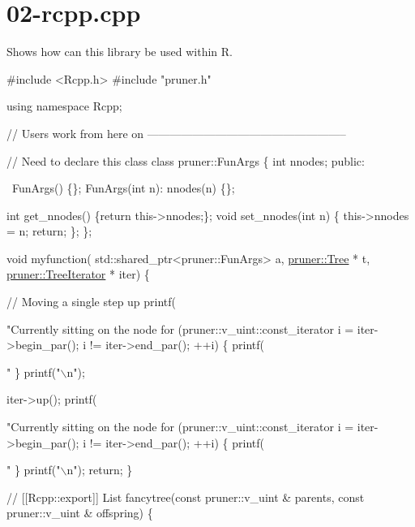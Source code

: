 \hypertarget{02-rcpp_8cpp-example}{}\section{02-\/rcpp.\+cpp}
Shows how can this library be used within R.


\begin{DoxyCodeInclude}
\textcolor{preprocessor}{#include <Rcpp.h>}
\textcolor{preprocessor}{#include "pruner.h"}  

\textcolor{keyword}{using namespace }Rcpp; 

\textcolor{comment}{// Users work from here on -----------------------------------------------------}

\textcolor{comment}{// Need to declare this class}
\textcolor{keyword}{class }pruner::FunArgs \{
  \textcolor{keywordtype}{int} nnodes;
\textcolor{keyword}{public}:
  
  ~FunArgs() \{\};
  FunArgs(\textcolor{keywordtype}{int} n): nnodes(n) \{\};
  
  \textcolor{keywordtype}{int} get\_nnodes() \{\textcolor{keywordflow}{return} this->nnodes;\};
  \textcolor{keywordtype}{void} set\_nnodes(\textcolor{keywordtype}{int} n) \{
    this->nnodes = n;
    \textcolor{keywordflow}{return};
  \};
\};

\textcolor{keywordtype}{void} myfunction(
    std::shared\_ptr<pruner::FunArgs> a,
    \hyperlink{classpruner_1_1Tree}{pruner::Tree} * t,
    \hyperlink{classpruner_1_1TreeIterator}{pruner::TreeIterator} * iter) \{
  
  \textcolor{comment}{// Moving a single step up}
  printf(\textcolor{stringliteral}{"Currently sitting on the node %
  \textcolor{keywordflow}{for} (pruner::v\_uint::const\_iterator i = iter->begin\_par(); i != iter->end\_par(); ++i) \{
    printf(\textcolor{stringliteral}{" %
  \}
  printf(\textcolor{stringliteral}{"\(\backslash\)n"});
  
  iter->up();
  printf(\textcolor{stringliteral}{"Currently sitting on the node %
  \textcolor{keywordflow}{for} (pruner::v\_uint::const\_iterator i = iter->begin\_par(); i != iter->end\_par(); ++i) \{
    printf(\textcolor{stringliteral}{" %
  \}
  printf(\textcolor{stringliteral}{"\(\backslash\)n"});
  \textcolor{keywordflow}{return};
\}

\textcolor{comment}{// [[Rcpp::export]]}
List fancytree(\textcolor{keyword}{const} pruner::v\_uint & parents, \textcolor{keyword}{const} pruner::v\_uint & offspring) \{
  
}}}}
\end{DoxyCodeInclude}
